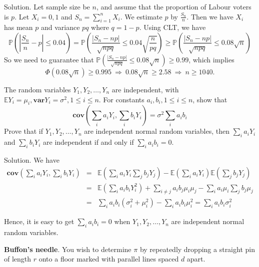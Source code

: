 Solution. Let sample size be $n$, and assume that the proportion of Labour voters is $p$. Let $X_i=0,1$ and $S_n=\sum^n_{i=1}X_i$. We estimate $p$ by $\frac{S_n}{n}$. Then we have $X_i$ has mean $p$ and variance $pq$ where $q=1-p$. Using CLT, we have
\begin{equation}
\mathbb{P}\left(\left|\frac{S_n}{n}-p\right|\leq 0.04\right) = \mathbb{P}\left(\frac{ \left|S_n-np\right|}{\sqrt{npq}}\leq 0.04\sqrt{\frac{n}{pq}}\right)\geq \mathbb{P}\left(\frac{ \left|S_n-np\right|}{\sqrt{npq}}\leq 0.08\sqrt{n}\right)
\end{equation}
So we need to guarantee that $\mathbb{P}\left(\frac{ \left|S_n-np\right|}{\sqrt{npq}}\leq 0.08\sqrt{n}\right)\geq 0.99$, which implies
\begin{equation}
\Phi\left(0.08\sqrt{n}\right) \geq 0.995 \ \Rightarrow \ 0.08\sqrt{n} \geq 2.58 \ \Rightarrow \ n\geq 1040.
\end{equation}


\item The random variables $Y_1,Y_2,\dots,Y_n$ are independent, with $\mathbb{E}Y_i=\mu_i,\mathbf{var}Y_i=\sigma^2,1\leq i\leq n$. For constants $a_i,b_i,1\leq i\leq n$, show that
\begin{equation}
\mathbf{cov}\left(\sum_ia_iY_i,\sum_ib_iY_i\right)=\sigma^2\sum_ia_ib_i
\end{equation}
Prove that if $Y_1,Y_2,\dots,Y_n$ are independent normal random variables, then $\sum_ia_iY_i$ and $\sum_ib_iY_i$ are independent if and only if $\sum_ia_ib_i=0$.



Solution. We have
\begin{eqnarray}
\mathbf{cov}\left(\sum_ia_iY_i,\sum_ib_iY_i\right) & = & \mathbb{E}\left(\sum_ia_iY_i\sum_jb_jY_j\right) - \mathbb{E}\left(\sum_ia_iY_i\right)\mathbb{E}\left(\sum_jb_jY_j\right) \nonumber\\
& = & \mathbb{E}\left(\sum_ia_ib_iY_i^2\right) + \sum_{i\ne j}a_ib_j\mu_i\mu_j - \sum_ia_i\mu_i \sum_jb_j\mu_j \nonumber\\
& = & \sum_ia_ib_i(\sigma_i^2+\mu_i^2) - \sum_ia_ib_i\mu_i^2 = \sum_ia_ib_i\sigma_i^2
\end{eqnarray}

Hence, it is easy to get $\sum_ia_ib_i=0$ when $Y_1,Y_2,\dots,Y_n$ are independent normal random variables. 


\item {\bf Buffon's needle}. You wish to determine $\pi$ by repeatedly dropping a straight pin of length $r$ onto a floor marked with parallel lines spaced $d$ apart.

